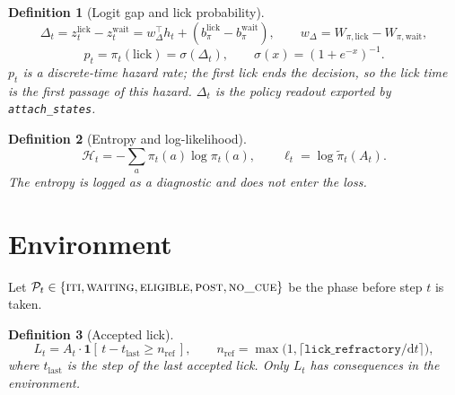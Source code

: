 \documentclass[11pt]{article}
\newtheorem{definition}{Definition}
\newcommand{\1}{\mathbf{1}}
\begin{document}
\begin{definition}[Logit gap and lick probability]
\begin{equation}
  \Delta_t = z_t^{\mathrm{lick}} - z_t^{\mathrm{wait}}
    = w_\Delta^{\top} h_t + (b_{\pi}^{\mathrm{lick}} - b_{\pi}^{\mathrm{wait}}),
  \qquad w_\Delta = W_{\pi,\mathrm{lick}} - W_{\pi,\mathrm{wait}},
\end{equation}
\begin{equation}
  p_t = \pi_t(\mathrm{lick}) = \sigma(\Delta_t), \qquad \sigma(x) = (1+e^{-x})^{-1}.
\end{equation}
$p_t$ is a discrete-time hazard rate; the first lick ends the decision, so the lick time
is the first passage of this hazard. $\Delta_t$ is the \emph{policy readout} exported by
\texttt{attach\_states}.
\end{definition}

\begin{definition}[Entropy and log-likelihood]
\begin{equation}
  \mathcal{H}_t = -\!\sum_{a}\! \pi_t(a)\log \pi_t(a), \qquad
  \ell_t = \log \tilde\pi_t(A_t).
\end{equation}
The entropy is logged as a diagnostic and does not enter the loss.
\end{definition}

\section{Environment}\label{sec:env}

Let $\mathcal{P}_t \in \{\textsc{iti}, \textsc{waiting}, \textsc{eligible}, \textsc{post},
\textsc{no\_cue}\}$ be the phase before step $t$ is taken.

\begin{definition}[Accepted lick]
\begin{equation}
  L_t = A_t \cdot \1\!\left[\, t - t_{\mathrm{last}} \ge n_{\mathrm{ref}} \,\right],
  \qquad n_{\mathrm{ref}} = \max\!\bigl(1, \lceil \texttt{lick\_refractory}/\mathrm{d}t \rceil\bigr),
\end{equation}
where $t_{\mathrm{last}}$ is the step of the last accepted lick. Only $L_t$ has
consequences in the environment.
\end{definition}
\end{document}
